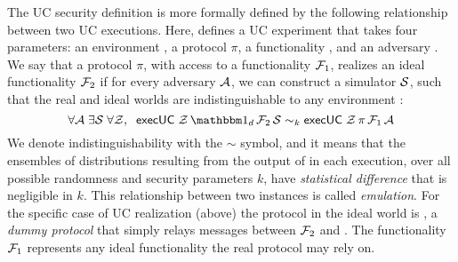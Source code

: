 
The UC security definition is more formally defined by the following relationship between two UC executions. 
Here,  defines a UC experiment that takes four parameters: an environment \Z, a protocol $\pi$,
a functionality \F, and an adversary \A.
We say that a protocol $\pi$, with access to a functionality $\mathcal{F}_1$, realizes an ideal functionality $\mathcal{F}_2$
if for every adversary $\mathcal{A}$, we can construct a simulator $\mathcal{S}$, such that the real and ideal worlds are
indistinguishable to any environment \Z:
\begin{equation}
  \label{eqn:emulation}
  \forall \A \; \exists \Sim \; \forall \Z, \; \; \msf{execUC} \; \Z \, \idealP \, \F_2 \, \Sim \sim_k \msf{execUC} \; \Z \, \pi \, \F_1 \, \A
\end{equation}
We denote indistinguishability with the $\sim$ symbol, and it means that the ensembles of distributions resulting
from the output of \Z in each execution, over all possible randomness and security parameters $k$, have
\emph{statistical difference} that is negligible in $k$.
This relationship between two  instances is called \emph{emulation}. 
For the specific case of UC realization (above) the protocol in the ideal world is \idealP,
a \emph{dummy protocol} that simply relays messages between $\mathcal{F}_2$ and \Z.
The functionality $\mathcal{F}_1$ represents any ideal functionality the real protocol may rely on.

